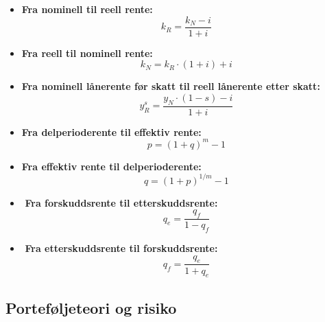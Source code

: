 \documentclass[
  11pt,
  a4paper,
]{article}
\begin{document}
\begin{itemize}
\item
  \textbf{Fra nominell til reell rente:}\\
  \[
  k_R = \frac{k_N - i}{1 + i}
  \]
\item
  \textbf{Fra reell til nominell rente:}\\
  \[
  k_N = k_R \cdot (1 + i) + i
  \]
\item
  \textbf{Fra nominell lånerente før skatt til reell lånerente etter
  skatt:}\\
  \[
  y_R^s = \frac{y_N \cdot (1-s) -i}{1+i}
  \]
\item
  \textbf{Fra delperioderente til effektiv rente:}\\
  \[
  p = (1 + q)^m - 1
  \]
\item
  \textbf{Fra effektiv rente til delperioderente:}\\
  \[
  q = (1 + p)^{1/m} - 1
  \]
\item
  ️ \textbf{Fra forskuddsrente til etterskuddsrente:}\\
  \[
  q_e = \frac{q_f}{1 - q_f}
  \]
\item
  ️ \textbf{Fra etterskuddsrente til forskuddsrente:}\\
  \[
  q_f = \frac{q_e}{1 + q_e}
  \]
\end{itemize}

\subsection{Porteføljeteori og
risiko}\label{portefuxf8ljeteori-og-risiko}
\end{document}
